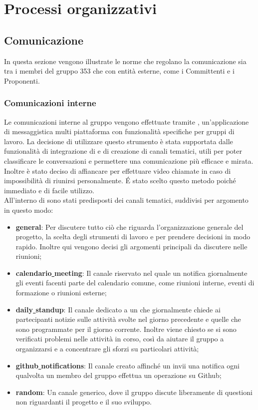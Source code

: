 \documentclass[NormeDiProgetto.tex]{subfiles}
\begin{document}
	
	\chapter{Processi organizzativi}
	
	\section{Comunicazione}
	In questa sezione vengono illustrate le norme che regolano la comunicazione sia tra i membri del gruppo 353 che con entità esterne, come i Committenti e i Proponenti.
	\subsection{Comunicazioni interne}
	Le comunicazioni interne al gruppo vengono effettuate tramite , un'applicazione di messaggistica multi piattaforma con funzionalità specifiche per gruppi di lavoro. La decisione di utilizzare questo strumento è stata supportata dalle funzionalità di integrazione di  e di creazione di canali tematici, utili per poter classificare le conversazioni e permettere una comunicazione più efficace e mirata. 
	\\
	Inoltre è stato deciso di affiancare  per effettuare video chiamate in caso di impossibilità di riunirsi personalmente. \'{E} stato scelto questo metodo poiché immediato e di facile utilizzo.
	\\
	All'interno di  sono stati predisposti dei canali tematici, suddivisi per argomento in questo modo:
	\begin{itemize}
		\item \textbf{general}: Per discutere tutto ciò che riguarda l'organizzazione generale del progetto, la scelta degli strumenti di lavoro e per prendere decisioni in modo rapido. Inoltre qui vengono decisi gli argomenti principali da discutere nelle riunioni;
		\item \textbf{calendario\underline{ }meeting}: Il canale riservato nel quale un  notifica giornalmente gli eventi facenti parte del calendario comune, come riunioni interne, eventi di formazione o riunioni esterne;
		\item \textbf{daily\underline{ }standup}: Il canale dedicato a un  che giornalmente chiede ai partecipanti notizie sulle attività svolte nel giorno precedente e quelle che sono programmate per il giorno corrente. Inoltre viene chiesto se si sono verificati problemi nelle attività in corso, così da aiutare il gruppo a organizzarsi e a concentrare gli sforzi su particolari attività;
		\item \textbf{github\underline{ }notifications}: Il canale creato affinché un  invii una notifica ogni qualvolta un membro del gruppo effettua un operazione su Github;
		\item \textbf{random}: Un canale generico, dove il gruppo discute liberamente di questioni non riguardanti il progetto e il suo sviluppo.
		
	\end{itemize}
\end{document}
